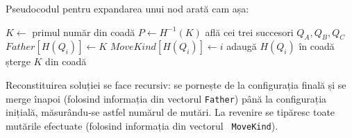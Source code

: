 Pseudocodul pentru expandarea unui nod arată cam așa:

\vspace{\algskip}
\begin{algorithmic}[1]
  \STATE $K \leftarrow$ primul număr din coadă
  \STATE $P \leftarrow H^{-1}(K)$
  \STATE află cei trei succesori $Q_A, Q_B, Q_C$
  \STATE $Father[H(Q_i)] \leftarrow K$
  \STATE $MoveKind[H(Q_i)] \leftarrow i$
  \STATE adaugă $H(Q_i)$ în coadă
  \ENDIF
  \ENDFOR
  \STATE șterge $K$ din coadă
\end{algorithmic}

Reconstituirea soluției se face recursiv: se pornește de la configurația
finală și se merge înapoi (folosind informația din vectorul {\tt Father}) până
la configurația inițială, măsurându-se astfel numărul de mutări. La revenire
se tipăresc toate mutările efectuate (folosind informația din vectorul {\tt
  MoveKind}).

